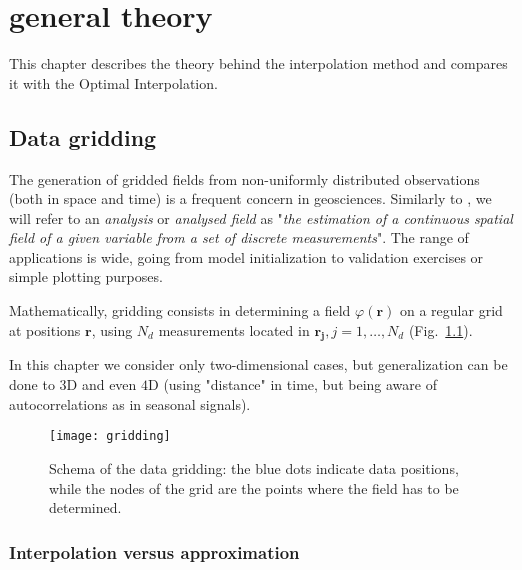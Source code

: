 \chapter[General theory]{\diva general theory\label{chaptheory}}

This chapter describes the theory behind the \diva interpolation method and compares it with the Optimal Interpolation. 

\minitoc


\section[Data gridding]{Data gridding\label{gridding}}

The generation of gridded fields from non-uniformly distributed observations (both in space and time) is a frequent concern in geosciences. Similarly to \citet{OOYAMA87}, we will refer to an \textit{analysis} or \textit{analysed field} as "\textit{the estimation of a continuous spatial field of a given variable from a set of discrete measurements}". The range of applications is wide, going from model initialization to validation exercises or simple plotting purposes. 

Mathematically, gridding consists in determining a field $\varphi(\mathbf{r})$ on a regular grid at positions $\mathbf{r}$, using $N_{d}$ measurements located in $\mathbf{r_{j}}, j=1,\ldots, N_{d}$ (Fig.~\ref{gridproblem}).  

In this chapter we consider only two-dimensional cases, but generalization can be done to $3$D and even $4$D (using "distance" in time, but being aware of autocorrelations as in seasonal signals).

\begin{figure}[htpb]
	\centering
	\parbox{.5\textwidth}{
		\texttt{[image: gridding]}
		}\parbox{.5\textwidth}{
		\caption[Schema of the data gridding.]{Schema of the data gridding: the blue dots indicate data positions, while the nodes of the grid are the points where the field has to be determined.\label{gridproblem}}
		}
\end{figure}

\subsection{Interpolation versus approximation}


